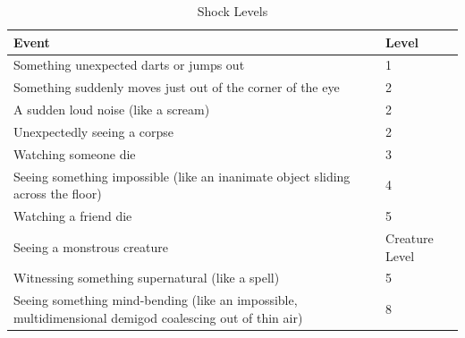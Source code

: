\begin{table}[h]

\centering
\caption{Shock Levels}
\label{lab:Shock Levels}

\begin{tabularx}{\textwidth}{| Y | p{1.5cm} |}
\hline

\textbf{Event} & \textbf{Level} \\ \hline

Something unexpected darts or jumps out & 1 \\ \hline
Something suddenly moves just out of the corner of the eye & 2 \\ \hline
A sudden loud noise (like a scream) & 2 \\ \hline
Unexpectedly seeing a corpse & 2 \\ \hline
Watching someone die & 3 \\ \hline
Seeing something impossible (like an inanimate object sliding across the floor) & 4 \\ \hline
Watching a friend die & 5 \\ \hline
Seeing a monstrous creature & Creature Level \\ \hline
Witnessing something supernatural (like a spell) & 5 \\ \hline
Seeing something mind-bending (like an impossible, multidimensional demigod coalescing out of thin air) & 8 \\ \hline

\end{tabularx}
\end{table}


